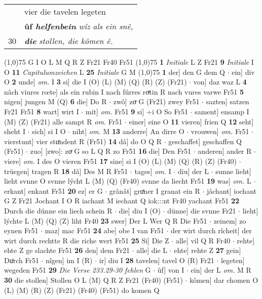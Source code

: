 \documentclass[8pt,a4paper,notitlepage]{article}
\begin{document}
\begin{table}[ht]
\begin{minipage}[t]{0.5\linewidth}
\begin{tabular}{rl}
 & vier die tavelen legeten\\ 
 & \textbf{ûf \textit{helfenbein}} \textit{wîz als ein snê,}\\ 
30 & \textit{\textbf{die}} \textit{stollen, die kômen ê.}\\ 
\end{tabular}
\scriptsize
\line(1,0){75} \newline
G I O L M Q R Z Fr21 Fr40 Fr51 \newline
\line(1,0){75} \newline
\textbf{1} \textit{Initiale} L Z Fr21  \textbf{9} \textit{Initiale} I O  \textbf{11} \textit{Capitulumzeichen} L  \textbf{25} \textit{Initiale} G M  \newline
\line(1,0){75} \newline
\textbf{1} der] den G dem Q  $\cdot$ ein] div O \textbf{2} unde] \textit{om.} I \textbf{3} si] die I (O) (L) (M) (Q) (R) (Z) (Fr21)  $\cdot$ von] daz waz L \textbf{4} nâch viures rœte] als ein rubin I nach fúrres roͯtin R nach vures varwe Fr51 \textbf{5} nigen] jungen M (Q) \textbf{6} die] Do R  $\cdot$ zwô] zoͮ G (Fr21) zwey Fr51  $\cdot$ sazten] satzen Fr21 Fr51 \textbf{8} wart] wirt I  $\cdot$ mit] \textit{om.} Fr51 \textbf{9} si] ÷i O So Fr51  $\cdot$ sament] ensamp I (M) (Z) (Fr21) alle sampt R \textit{om.} Fr51  $\cdot$ einer] eine O \textbf{11} vieren] frien Q \textbf{12} seht] sheht I  $\cdot$ sich] si I O  $\cdot$ niht] \textit{om.} M \textbf{13} anderre] An dirre O  $\cdot$ vrouwen] \textit{om.} Fr51  $\cdot$ vierstunt] vier stuͦndent R (Fr51) \textbf{14} dâ] do O Q R  $\cdot$ geschaffet] geschaffen Q (Fr51)  $\cdot$ zuo] [zwo]: zoͮ G so L Q R zo Fr51 \textbf{16} die] Den Fr51  $\cdot$ anderen] ander R  $\cdot$ viere] \textit{om.} I des O vieren Fr51 \textbf{17} sine] si I (O) (L) (M) (Q) (R) (Z) (Fr40)  $\cdot$ trüegen] tragen R \textbf{18} dâ] Des M R Fr51  $\cdot$ tages] \textit{om.} I  $\cdot$ diu] der L  $\cdot$ sunne lieht] lieht svnne O svnne lýcht L (M) (Q) (Fr40) svnne da liecht Fr51 \textbf{19} was] \textit{om.} L  $\cdot$ erkant] enkant Fr51 \textbf{20} ez] er G  $\cdot$ grânât] gruͤner I granat ein R  $\cdot$ jâchant] iochant G Z Fr21 Jochant I O R iachant M iechant Q iok:::nt Fr40 yachant Fr51 \textbf{22} Durch die dúnne ein liech schein R  $\cdot$ die] diu I (O)  $\cdot$ dünne] die svnne Fr21  $\cdot$ lieht] lýchte L (M) (Q) (Z) liht Fr40 \textbf{23} swer] Der L Wer Q R Die Fr51  $\cdot$ zeinem] zo eynen Fr51  $\cdot$ maz] mac Fr51 \textbf{24} abe] obe I van Fr51  $\cdot$ der wirt durch rîcheit] der wirt durch rechtte R die riche wert Fr51 \textbf{25} Si] Die Z  $\cdot$ alle] vil Q R Fr40  $\cdot$ rehte] ehte Z ge slachte Fr51 \textbf{26} den] dem Fr21  $\cdot$ alle] die L  $\cdot$ ehte] rehte Z \textbf{27} gein] Duͦrch Fr51  $\cdot$ nîgen] im I (R)  $\cdot$ ir] diu I \textbf{28} tavelen] tavel O (R) Fr21  $\cdot$ legeten] wegeden Fr51 \textbf{29} \textit{Die Verse 233.29-30 fehlen} G   $\cdot$ ûf] von I  $\cdot$ ein] der L \textit{om.} M R \textbf{30} die stollen] Stollen O L (M) Q R Z Fr21 (Fr40) (Fr51)  $\cdot$ kômen] dar chomen O (L) (M) (R) (Z) (Fr21) (Fr40) (Fr51) do komen Q \newline

\end{minipage}
\end{table}
\end{document}
